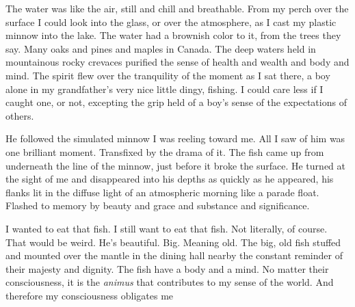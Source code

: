 

The water was like the air, still and chill and breathable.  From my
perch over the surface I could look into the glass, or over the
atmosphere, as I cast my plastic minnow into the lake.  The water had
a brownish color to it, from the trees they say.  Many oaks and pines
and maples in Canada.  The deep waters held in mountainous rocky
crevaces purified the sense of health and wealth and body and mind.
The spirit flew over the tranquility of the moment as I sat there, a
boy alone in my grandfather's very nice little dingy, fishing.  I
could care less if I caught one, or not, excepting the grip held of
a boy's sense of the expectations of others.

He followed the simulated minnow I was reeling toward me.  All I saw
of him was one brilliant moment.  Transfixed by the drama of it.  The
fish came up from underneath the line of the minnow, just before it
broke the surface.  He turned at the sight of me and disappeared into
his depths as quickly as he appeared, his flanks lit in the diffuse
light of an atmospheric morning like a parade float.  Flashed to
memory by beauty and grace and substance and significance.

I wanted to eat that fish.  I still want to eat that fish.  Not
literally, of course.  That would be weird.  He's beautiful.  Big.
Meaning old.  The big, old fish stuffed and mounted over the mantle in
the dining hall nearby the constant reminder of their majesty and
dignity.  The fish have a body and a mind.  No matter their
consciousness, it is the {\it animus} that contributes to my sense of
the world.  And therefore my consciousness obligates me 

\bye
